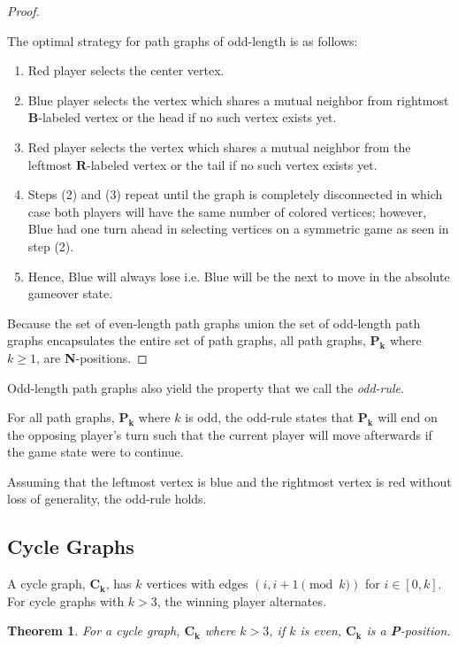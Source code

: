 \documentclass{sig-alternate}
\newtheorem{theorem}{Theorem}
\newcommand\npos[0]{\textbf{N}}
\newcommand\ppos[0]{\textbf{P}}
\begin{document}
\begin{proof}
		\begin{case}
		The optimal strategy for path graphs of odd-length is as follows:
		\begin{enumerate}
			\item Red player selects the center vertex.
			\item Blue player selects the vertex which shares a mutual neighbor
				from rightmost $\mathbf{B}$-labeled vertex or the head if no such
				vertex exists yet.
			\item Red player selects the vertex which shares a mutual neighbor
				from the leftmost $\mathbf{R}$-labeled vertex or the tail if no
				such vertex exists yet.
			\item Steps (2) and (3) repeat until the graph is completely
				disconnected in which case both players will have the same number
				of colored vertices; however, Blue had one turn ahead in selecting
				vertices on a symmetric game as seen in step (2).
			\item Hence, Blue will always lose i.e. Blue will be the next to move
				in the absolute gameover state.
		\end{enumerate}
		\end{case}

		Because the set of even-length path graphs union the set of odd-length
		path graphs encapsulates the entire set of path graphs, all path
		graphs, $\mathbf{P_k}$ where $k \geq 1$, are \npos-positions.
	\end{proof}

	Odd-length path graphs also yield the property that we call the
	\emph{odd-rule}.
	\begin{defn}
		For all path graphs, $\mathbf{P_k}$ where $k$ is odd, the odd-rule
		states that $\mathbf{P_k}$ will end on the opposing player's turn such
		that the current player will move afterwards if the game state were to
		continue.
	\end{defn}

	\begin{remark}
		Assuming that the leftmost vertex is blue and the rightmost vertex is
		red without loss of generality, the odd-rule holds.
	\end{remark}

	\subsection{Cycle Graphs}
	A cycle graph, $\mathbf{C_k}$, has $k$ vertices with edges $(i, i+1
	\pmod{k})$ for $i\in[0,k]$. For cycle graphs with $k>3$, the winning
	player alternates.
	\begin{theorem}
	For a cycle graph, $\mathbf{C_k}$ where $k>3$, if $k$ is even, $\mathbf{C_k}$ is a \ppos-position.
	\end{theorem}
\end{document}
